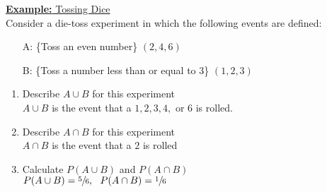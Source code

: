 \documentclass[a4paper]{article}
\let\bf\textbf
\begin{document}
\begin{shaded}
    \underline{\bf{Example:} Tossing Dice}
    \vspace{2mm}\\
    Consider a die-toss experiment in which the following events are defined:
    \begin{itemize}
        \item[A:] \{Toss an even number\} $(2,4,6)$
        \item[B:] \{Toss a number less than or equal to 3\} $(1,2,3)$  
    \end{itemize}
    \vspace{0.5mm}
    \begin{enumerate}
        \item Describe $A \cup B$ for this experiment\\
        $A \cup B$ is the event that a $1, 2, 3, 4,$ or $6$ is rolled.
        \item Describe $A \cap B$ for this experiment\\
        $A \cap B$ is the event that a $2$ is rolled
        \item Calculate $P(A \cup B)$ and $P(A \cap B)$\\
        $P(A \cup B) = \sfrac{5}{6},\ \ P(A \cap B) = \sfrac{1}{6}$
    \end{enumerate}
\end{shaded}
\end{document}
